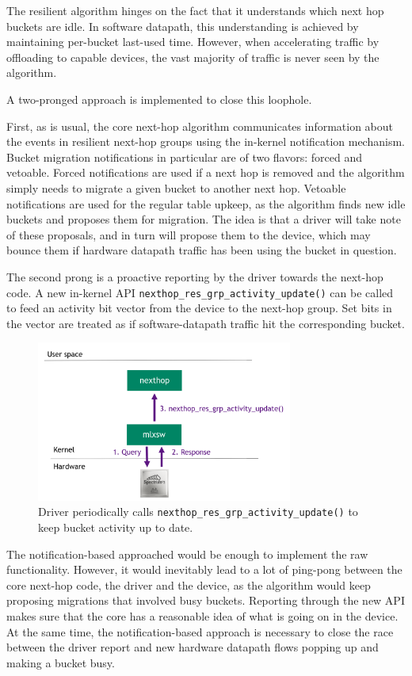 \documentclass[letterpaper]{article}
\begin{document}
The resilient algorithm hinges on the fact that it understands which next
hop buckets are idle. In software datapath, this understanding is achieved
by maintaining per-bucket last-used time. However, when accelerating
traffic by offloading to capable devices, the vast majority of traffic is
never seen by the algorithm.

A two-pronged approach is implemented to close this loophole.

First, as is usual, the core next-hop algorithm communicates information
about the events in resilient next-hop groups using the in-kernel
notification mechanism. Bucket migration notifications in particular are of
two flavors: forced and vetoable. Forced notifications are used if a next
hop is removed and the algorithm simply needs to migrate a given bucket to
another next hop. Vetoable notifications are used for the regular table
upkeep, as the algorithm finds new idle buckets and proposes them for
migration. The idea is that a driver will take note of these proposals, and
in turn will propose them to the device, which may bounce them if hardware
datapath traffic has been using the bucket in question.

The second prong is a proactive reporting by the driver towards the
next-hop code. A new in-kernel API
\texttt{nexthop\_res\_grp\_activity\_update()} can be called to feed an
activity bit vector from the device to the next-hop group. Set bits in the
vector are treated as if software-datapath traffic hit the corresponding
bucket.

\begin{figure}[H]
\includegraphics[width=3.31in]{nexthop_res_grp_activity_update.png}
\caption{Driver periodically calls
  \texttt{nexthop\_res\_grp\_activity\_update()} to keep bucket activity up
  to date.}
\label{fig:nexthop_res_grp_activity_update}
\end{figure}

The notification-based approached would be enough to implement the raw
functionality. However, it would inevitably lead to a lot of ping-pong
between the core next-hop code, the driver and the device, as the algorithm
would keep proposing migrations that involved busy buckets. Reporting
through the new API makes sure that the core has a reasonable idea of what
is going on in the device. At the same time, the notification-based
approach is necessary to close the race between the driver report and new
hardware datapath flows popping up and making a bucket busy.
\end{document}
